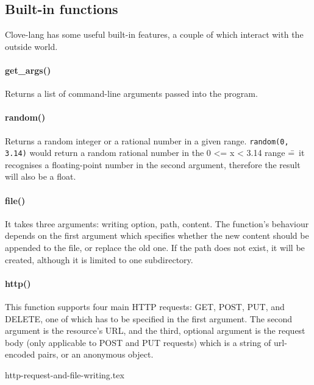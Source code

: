 \documentclass[12pt,a4paper]{article}
\begin{document}
\subsection*{Built-in functions}
Clove-lang has some useful built-in features, a couple of which interact with the outside world.

\paragraph*{get\_args()}
Returns a list of command-line arguments passed into the program.

\vspace{-0.75em}
\paragraph*{random()}
Returns a random integer or a rational number in a given range. \texttt{random(0, 3.14)} would return a random rational number in the 0 <= x < 3.14 range \==~it recognises a floating-point number in the second argument, therefore the result will also be a float.

\vspace{-0.75em}
\paragraph*{file()}
It takes three arguments: writing option, path, content. The function's behaviour depends on the first argument which specifies whether the new content should be appended to the file, or replace the old one. If the path does not exist, it will be created, although it is limited to one subdirectory.

\vspace{-0.75em}
\paragraph*{http()}
This function supports four main HTTP requests: GET, POST, PUT, and DELETE, one of which has to be specified in the first argument. The second argument is the resource's URL, and the third, optional argument is the request body (only applicable to POST and PUT requests) which is a string of url-encoded pairs, or an anonymous object.

{http-request-and-file-writing.tex}
\end{document}
